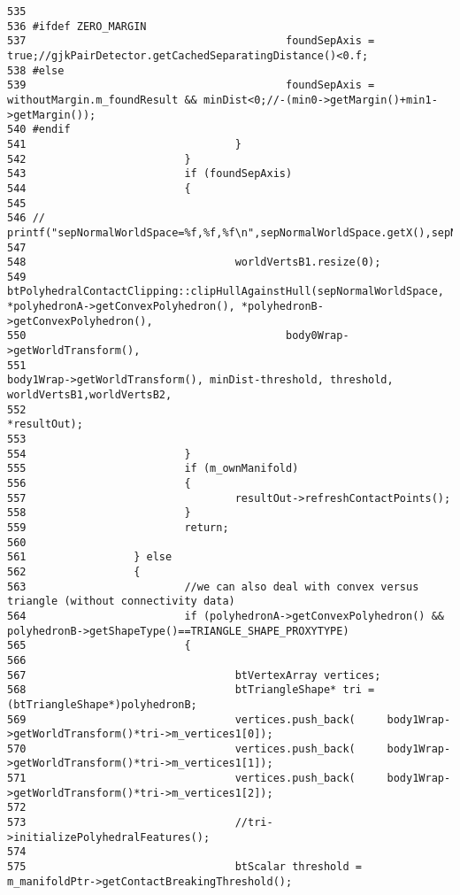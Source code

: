 \begin{Code}
\begin{verbatim}
535         
536 #ifdef ZERO_MARGIN
537                                         foundSepAxis = true;//gjkPairDetector.getCachedSeparatingDistance()<0.f;
538 #else
539                                         foundSepAxis = withoutMargin.m_foundResult && minDist<0;//-(min0->getMargin()+min1->getMargin());
540 #endif
541                                 }
542                         }
543                         if (foundSepAxis)
544                         {
545                                 
546 //                              printf("sepNormalWorldSpace=%f,%f,%f\n",sepNormalWorldSpace.getX(),sepNormalWorldSpace.getY(),sepNormalWorldSpace.getZ());
547 
548                                 worldVertsB1.resize(0);
549                                 btPolyhedralContactClipping::clipHullAgainstHull(sepNormalWorldSpace, *polyhedronA->getConvexPolyhedron(), *polyhedronB->getConvexPolyhedron(),
550                                         body0Wrap->getWorldTransform(), 
551                                                                                                                                  body1Wrap->getWorldTransform(), minDist-threshold, threshold, worldVertsB1,worldVertsB2,
552                                                                                                                                  *resultOut);
553                                 
554                         }
555                         if (m_ownManifold)
556                         {
557                                 resultOut->refreshContactPoints();
558                         }
559                         return;
560 
561                 } else
562                 {
563                         //we can also deal with convex versus triangle (without connectivity data)
564                         if (polyhedronA->getConvexPolyhedron() && polyhedronB->getShapeType()==TRIANGLE_SHAPE_PROXYTYPE)
565                         {
566 
567                                 btVertexArray vertices;
568                                 btTriangleShape* tri = (btTriangleShape*)polyhedronB;
569                                 vertices.push_back(     body1Wrap->getWorldTransform()*tri->m_vertices1[0]);
570                                 vertices.push_back(     body1Wrap->getWorldTransform()*tri->m_vertices1[1]);
571                                 vertices.push_back(     body1Wrap->getWorldTransform()*tri->m_vertices1[2]);
572                                 
573                                 //tri->initializePolyhedralFeatures();
574 
575                                 btScalar threshold = m_manifoldPtr->getContactBreakingThreshold();

\end{verbatim}
\end{Code}
